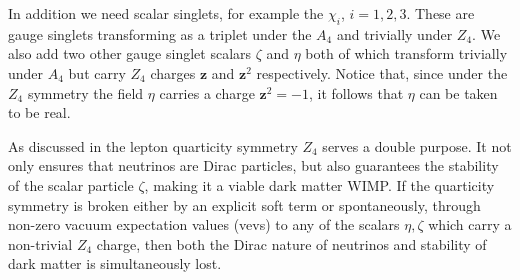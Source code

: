 \documentclass[english,10pt,aps,prd,a4paper,preprintnumbers,floatfix,nofootinbib,showpacs,superscriptaddress]{revtex4-1}
\begin{document}
In addition we need scalar singlets, for example the $\chi_i$,
$i = 1, 2, 3$. These are gauge singlets transforming as a triplet
under the $A_4$ and trivially under $Z_4$. We also add two other gauge
singlet scalars $\zeta$ and $\eta$ both of which transform trivially
under $A_4$ but carry $Z_4$ charges $\mathbf{z}$ and $\mathbf{z}^2$
respectively.
Notice that, since under the $Z_4$ symmetry the field $\eta$ carries a
charge $\mathbf{z}^2 = -1$, it follows that $\eta$ can be taken to be
real.
  

As discussed in \cite{Chulia:2016ngi, Chulia:2016giq} the lepton
quarticity symmetry $Z_4$ serves a double purpose. It not only ensures
that neutrinos are Dirac particles, but also guarantees the stability
of the scalar particle $\zeta$, making it a viable dark matter
WIMP. If the quarticity symmetry is broken either by an explicit soft
term or spontaneously, through non-zero vacuum expectation values
(vevs) to any of the scalars $\eta, \zeta$ which carry a non-trivial
$Z_4$ charge, then both the Dirac nature of neutrinos and stability of
dark matter is simultaneously lost.
\end{document}
